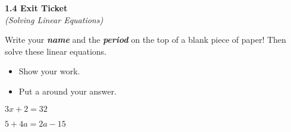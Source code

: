 \begin{center}
    \sffamily
    {
        \huge
        \bfseries
        1.4 Exit Ticket\\
    }
    {
        \Large
        \itshape
        (Solving Linear Equations)
    }
\end{center}

\noindent
\Large
Write your {\bfseries\itshape name} and the {\bfseries\itshape period} 
on the top of a blank piece of paper!
Then solve these linear equations.
\begin{itemize}
    \item Show your work.
    \item Put a  around your answer.
\end{itemize}
\vspace{0.25in}

\myProblemsWithContent
{
    \Large
    \begin{center}
    $ 3x + 2 = 32 $
    \end{center}
    \vspace{1in}
}
{
    \Large
    \begin{center}
    $ 5 + 4a = 2a -15$
    \end{center}
}

